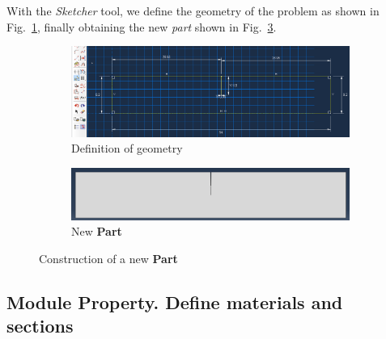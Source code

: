 With the \textit{Sketcher} tool, we define the geometry of the problem
as shown in Fig.~\ref{part03}, finally obtaining the new \textit{part}
shown in Fig.~\ref{part04}.
\begin{figure}[!h]
  \centering
  \begin{subfigure}[!h]{1.0\textwidth}
    \includegraphics[width=\textwidth]{./body/images/part03}
    \caption{Definition of geometry}
    \label{part03}
  \end{subfigure}%
    
  \begin{subfigure}[!h]{0.875\textwidth}
    \includegraphics[width=\textwidth]{./body/images/part04}
    \caption{New \textbf{Part}}
    \label{part04}
  \end{subfigure}%
  \caption{Construction of a new \textbf{Part}}
\end{figure}

\subsection{Module Property. Define materials and sections}

